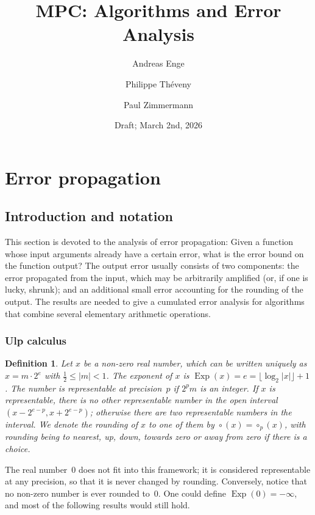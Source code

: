 \documentclass [11pt]{article}
\title {MPC: Algorithms and Error Analysis}
\author {Andreas Enge \and Philippe Th\'eveny \and Paul Zimmermann}
\date {Draft; March 2nd, 2026}
\DeclareMathOperator{\Exp}{\operatorname {Exp}}
\newcommand {\round}{\operatorname {\circ}}
\newtheorem{definition}[theorem]{Definition}
\begin{document}
\maketitle
\tableofcontents


\section {Error propagation}

\subsection {Introduction and notation}

This section is devoted to the analysis of error propagation: Given a function
whose input arguments already have a certain error, what is the error bound on
the function output? The output error usually consists of two components: the
error propagated from the input, which may be arbitrarily amplified (or, if
one is lucky, shrunk); and an
additional small error accounting for the rounding of the output. The results
are needed to give a cumulated error analysis for algorithms that combine
several elementary arithmetic operations.


\subsubsection {Ulp calculus}

\begin {definition}
\label {def:exp}
Let $x$ be a non-zero real number, which can be written uniquely as
$x = m \cdot 2^e$ with $\frac{1}{2} \le |m| < 1$.
The {\em exponent} of $x$ is
$\Exp(x) = e = \lfloor \log_2 |x| \rfloor + 1$.
The number is {\em representable at precision~$p$} if
$2^p m$ is an integer.
If $x$ is representable, there is no other representable number in the
open interval $(x - 2^{e-p}, x + 2^{e-p})$; otherwise there are two
representable numbers in the interval.
We denote the rounding of $x$ to one of them by
$\round (x) = \round_p (x)$, with rounding being to nearest, up, down,
towards zero or away from zero if there is a choice.
\end {definition}

The real number~$0$ does not fit into this framework; it is considered
representable at any precision, so that it is never changed by rounding.
Conversely, notice that no non-zero number is ever rounded to~$0$.
One could define $\Exp(0) = -\infty$, and most of the following results
would still hold.
\end{document}
